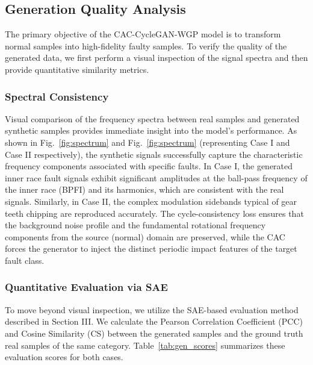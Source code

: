 \subsection{Generation Quality Analysis}
The primary objective of the CAC-CycleGAN-WGP model is to transform normal samples into high-fidelity faulty samples. To verify the quality of the generated data, we first perform a visual inspection of the signal spectra and then provide quantitative similarity metrics.

\subsubsection{Spectral Consistency}
Visual comparison of the frequency spectra between real samples and generated synthetic samples provides immediate insight into the model's performance. As shown in Fig.~\ref{fig:spectrum} and Fig.~\ref{fig:spectrum} (representing Case I and Case II respectively), the synthetic signals successfully capture the characteristic frequency components associated with specific faults. In Case I, the generated inner race fault signals exhibit significant amplitudes at the ball-pass frequency of the inner race (BPFI) and its harmonics, which are consistent with the real signals. Similarly, in Case II, the complex modulation sidebands typical of gear teeth chipping are reproduced accurately. The cycle-consistency loss ensures that the background noise profile and the fundamental rotational frequency components from the source (normal) domain are preserved, while the CAC forces the generator to inject the distinct periodic impact features of the target fault class.

\subsubsection{Quantitative Evaluation via SAE}
To move beyond visual inspection, we utilize the SAE-based evaluation method described in Section III. We calculate the Pearson Correlation Coefficient (PCC) and Cosine Similarity (CS) between the generated samples and the ground truth real samples of the same category. Table~\ref{tab:gen_scores} summarizes these evaluation scores for both cases.

